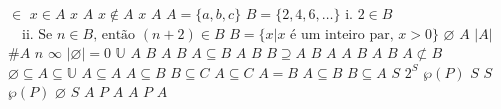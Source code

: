 \documentclass{article}
\begin{document}
$\in$
$x \in A$
$x$
$A$
$x \notin A$
$x$
$A$
$A = \{a, b, c\}$
$B = \{2, 4, 6, \dots\}$
$\text{i. } 2 \in B \quad$
$\quad\text{ii. Se } n \in B \text{, então } (n + 2) \in B$
$B = \{x | x \text{ é um inteiro par, } x > 0\}$
$\varnothing$
$A$
$|A|$
$\#A$
$n$
$\infty$
$|\varnothing| = 0$
$\mathbb{U}$
$A$
$B$
$A$
$B$
$A \subseteq B$
$A$
$B$
$B \supseteq A$
$B$
$A$
$A$
$B$
$A$
$B$
$A \not\subset B$
$\varnothing \subseteq A \subseteq \mathbb{U}$
$A \subseteq A$
$A \subseteq B$
$B \subseteq C$
$A \subseteq C$
$A = B$
$A \subseteq B$
$B \subseteq A$
$S$
$2^S$
$\wp (P)$
$S$
$S$
$\wp (P)$
$\varnothing$
$S$
$A$
$P$
$A$
$A$
$P$
$A$
\end{document}
